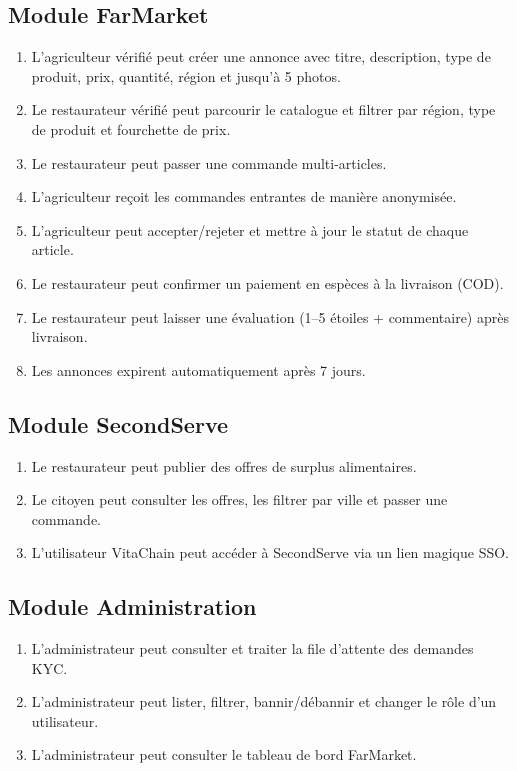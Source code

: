 \documentclass[12pt,a4paper]{report}
\begin{document}
\subsection*{Module FarMarket}
\begin{enumerate}[label=BF-FAR-\arabic*]
  \item L'agriculteur vérifié peut créer une annonce avec titre, description, type de
        produit, prix, quantité, région et jusqu'à 5 photos.
  \item Le restaurateur vérifié peut parcourir le catalogue et filtrer par région,
        type de produit et fourchette de prix.
  \item Le restaurateur peut passer une commande multi-articles.
  \item L'agriculteur reçoit les commandes entrantes de manière anonymisée.
  \item L'agriculteur peut accepter/rejeter et mettre à jour le statut de chaque
        article.
  \item Le restaurateur peut confirmer un paiement en espèces à la livraison (COD).
  \item Le restaurateur peut laisser une évaluation (1--5 étoiles + commentaire) après
        livraison.
  \item Les annonces expirent automatiquement après 7 jours.
\end{enumerate}

\subsection*{Module SecondServe}
\begin{enumerate}[label=BF-SEC-\arabic*]
  \item Le restaurateur peut publier des offres de surplus alimentaires.
  \item Le citoyen peut consulter les offres, les filtrer par ville et passer une
        commande.
  \item L'utilisateur VitaChain peut accéder à SecondServe via un lien magique SSO.
\end{enumerate}

\subsection*{Module Administration}
\begin{enumerate}[label=BF-ADM-\arabic*]
  \item L'administrateur peut consulter et traiter la file d'attente des demandes KYC.
  \item L'administrateur peut lister, filtrer, bannir/débannir et changer le rôle
        d'un utilisateur.
  \item L'administrateur peut consulter le tableau de bord FarMarket.
\end{enumerate}
\end{document}
